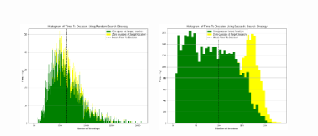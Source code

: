 \begin{landscape}
\begin{table}[h!]
\begin{tabular}{ | c | c | c | c | c |}
\begin{minipage}[c][58mm][c]{49mm}
    \end{minipage}
    &
    \begin{minipage}[c][58mm][c]{49mm}
      \includegraphics[width=49mm, height=52mm]{Chapters/MultiAgentTargetDetection/Figs/Histograms/VaryingPrior/Uniform/UniformRandomHistogram.png}
    \end{minipage}
    &
    \begin{minipage}[c][58mm][c]{49mm}
      \includegraphics[width=49mm, height=52mm]{Chapters/MultiAgentTargetDetection/Figs/Histograms/VaryingPrior/Uniform/UniformSaccadicHistogram.png}
    \end{minipage}
    \\
    \hline
   
  \end{tabular}
  \label{table:HistVaryingPriorDist}
\end{table}

\break


\vspace*{\fill}

\end{landscape}
